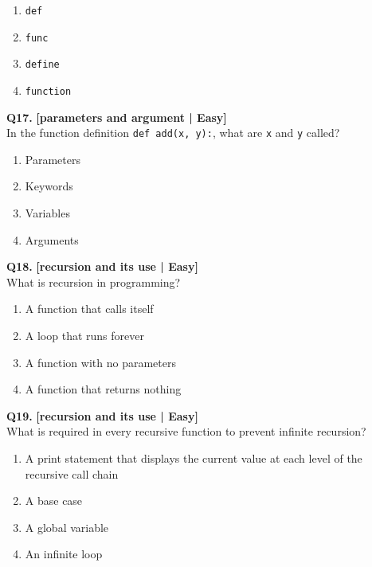 \begin{enumerate}[label=(\alph*),topsep=2pt,itemsep=1pt,partopsep=0pt,parsep=0pt]
    \item \relax \texttt{def}
    \item \relax \texttt{func}
    \item \relax \texttt{define}
    \item \relax \texttt{function}
\end{enumerate}
\vspace{2mm}

\noindent\textbf{Q17.} \hfill {\small\color{LPUOrange}\textbf{[parameters and argument | Easy]}}\\[2pt]
In the function definition \texttt{def add(x, y):}, what are \texttt{x} and \texttt{y} called?

\begin{enumerate}[label=(\alph*),topsep=2pt,itemsep=1pt,partopsep=0pt,parsep=0pt]
    \item \relax Parameters
    \item \relax Keywords
    \item \relax Variables
    \item \relax Arguments
\end{enumerate}
\vspace{2mm}

\noindent\textbf{Q18.} \hfill {\small\color{LPUOrange}\textbf{[recursion and its use | Easy]}}\\[2pt]
What is recursion in programming?

\begin{enumerate}[label=(\alph*),topsep=2pt,itemsep=1pt,partopsep=0pt,parsep=0pt]
    \item \relax A function that calls itself
    \item \relax A loop that runs forever
    \item \relax A function with no parameters
    \item \relax A function that returns nothing
\end{enumerate}
\vspace{2mm}

\noindent\textbf{Q19.} \hfill {\small\color{LPUOrange}\textbf{[recursion and its use | Easy]}}\\[2pt]
What is required in every recursive function to prevent infinite recursion?

\begin{enumerate}[label=(\alph*),topsep=2pt,itemsep=1pt,partopsep=0pt,parsep=0pt]
    \item \relax A print statement that displays the current value at each level of the recursive call chain
    \item \relax A base case
    \item \relax A global variable
    \item \relax An infinite loop
\end{enumerate}
\vspace{2mm}

